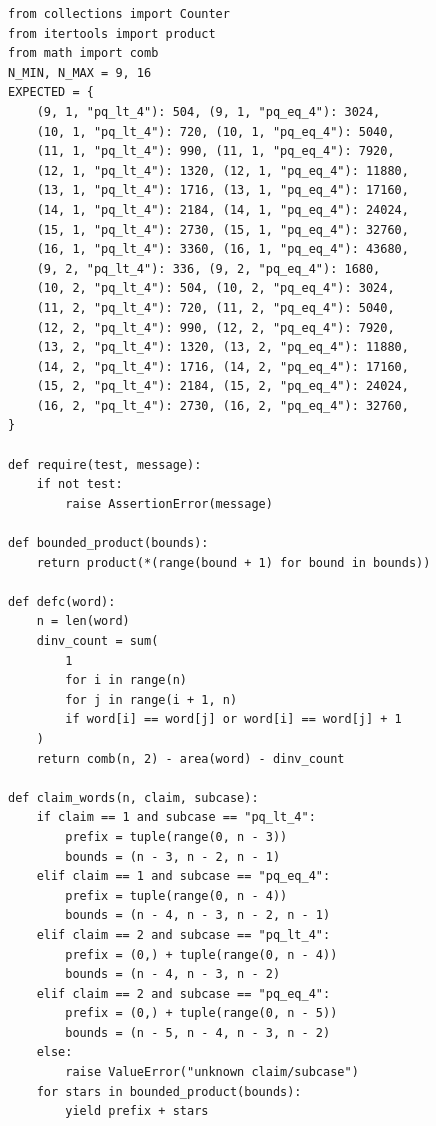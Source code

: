 \documentclass[11pt]{article}
\theoremstyle{plain}
\theoremstyle{definition}
\theoremstyle{remark}
\begin{document}
\begin{lstlisting}
from collections import Counter
from itertools import product
from math import comb
N_MIN, N_MAX = 9, 16
EXPECTED = {
    (9, 1, "pq_lt_4"): 504, (9, 1, "pq_eq_4"): 3024,
    (10, 1, "pq_lt_4"): 720, (10, 1, "pq_eq_4"): 5040,
    (11, 1, "pq_lt_4"): 990, (11, 1, "pq_eq_4"): 7920,
    (12, 1, "pq_lt_4"): 1320, (12, 1, "pq_eq_4"): 11880,
    (13, 1, "pq_lt_4"): 1716, (13, 1, "pq_eq_4"): 17160,
    (14, 1, "pq_lt_4"): 2184, (14, 1, "pq_eq_4"): 24024,
    (15, 1, "pq_lt_4"): 2730, (15, 1, "pq_eq_4"): 32760,
    (16, 1, "pq_lt_4"): 3360, (16, 1, "pq_eq_4"): 43680,
    (9, 2, "pq_lt_4"): 336, (9, 2, "pq_eq_4"): 1680,
    (10, 2, "pq_lt_4"): 504, (10, 2, "pq_eq_4"): 3024,
    (11, 2, "pq_lt_4"): 720, (11, 2, "pq_eq_4"): 5040,
    (12, 2, "pq_lt_4"): 990, (12, 2, "pq_eq_4"): 7920,
    (13, 2, "pq_lt_4"): 1320, (13, 2, "pq_eq_4"): 11880,
    (14, 2, "pq_lt_4"): 1716, (14, 2, "pq_eq_4"): 17160,
    (15, 2, "pq_lt_4"): 2184, (15, 2, "pq_eq_4"): 24024,
    (16, 2, "pq_lt_4"): 2730, (16, 2, "pq_eq_4"): 32760,
}

def require(test, message):
    if not test:
        raise AssertionError(message)

def bounded_product(bounds):
    return product(*(range(bound + 1) for bound in bounds))

def defc(word):
    n = len(word)
    dinv_count = sum(
        1
        for i in range(n)
        for j in range(i + 1, n)
        if word[i] == word[j] or word[i] == word[j] + 1
    )
    return comb(n, 2) - area(word) - dinv_count

def claim_words(n, claim, subcase):
    if claim == 1 and subcase == "pq_lt_4":
        prefix = tuple(range(0, n - 3))
        bounds = (n - 3, n - 2, n - 1)
    elif claim == 1 and subcase == "pq_eq_4":
        prefix = tuple(range(0, n - 4))
        bounds = (n - 4, n - 3, n - 2, n - 1)
    elif claim == 2 and subcase == "pq_lt_4":
        prefix = (0,) + tuple(range(0, n - 4))
        bounds = (n - 4, n - 3, n - 2)
    elif claim == 2 and subcase == "pq_eq_4":
        prefix = (0,) + tuple(range(0, n - 5))
        bounds = (n - 5, n - 4, n - 3, n - 2)
    else:
        raise ValueError("unknown claim/subcase")
    for stars in bounded_product(bounds):
        yield prefix + stars


\end{lstlisting}
\end{document}

